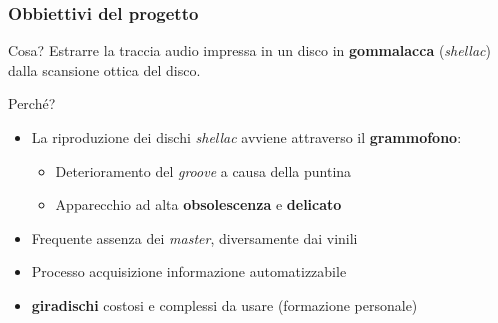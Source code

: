 \begin{frame}

\frametitle{Obbiettivi del progetto}

\begin{block}{Cosa?}
Estrarre la traccia audio impressa in un disco in \textbf{gommalacca}
(\emph{shellac}) dalla scansione ottica del disco.
\end{block}

\begin{block}{Perché?}
\begin{itemize}
\item La riproduzione dei dischi \emph{shellac} avviene attraverso il \textbf{grammofono}:
\vspace{-0.4cm}
\begin{itemize}
\item Deterioramento del \emph{groove} a causa della puntina
\item Apparecchio ad alta \textbf{obsolescenza} e \textbf{delicato}
\end{itemize}
\item Frequente assenza dei \emph{master}, diversamente dai vinili
\item Processo acquisizione informazione automatizzabile
\item \textbf{giradischi} costosi e complessi da usare (formazione personale)
\end{itemize}
\end{block}

\end{frame}
